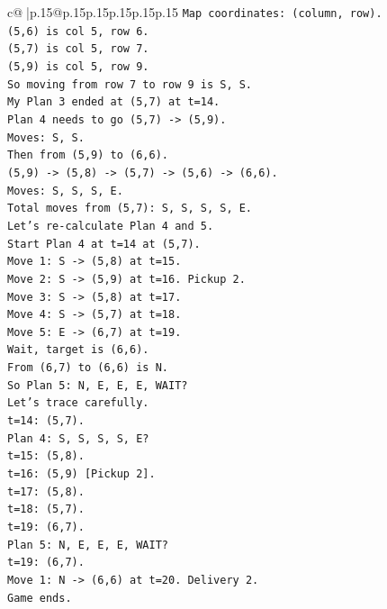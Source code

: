 \documentclass{article}
\begin{document}
{\begin{supertabular}{c@{$\;$}|p{.15\linewidth}@{}p{.15\linewidth}p{.15\linewidth}p{.15\linewidth}p{.15\linewidth}p{.15\linewidth}}
{{{\texttt{Map coordinates: (column, row).} \\
\texttt{(5,6) is col 5, row 6.} \\
\texttt{(5,7) is col 5, row 7.} \\
\texttt{(5,9) is col 5, row 9.} \\
\texttt{So moving from row 7 to row 9 is S, S.} \\
\texttt{My Plan 3 ended at (5,7) at t=14.} \\
\texttt{Plan 4 needs to go (5,7) {-}> (5,9).} \\
\texttt{Moves: S, S.} \\
\texttt{Then from (5,9) to (6,6).} \\
\texttt{(5,9) {-}> (5,8) {-}> (5,7) {-}> (5,6) {-}> (6,6).} \\
\texttt{Moves: S, S, S, E.} \\
\texttt{Total moves from (5,7): S, S, S, S, E.} \\
\texttt{Let's re{-}calculate Plan 4 and 5.} \\
\texttt{Start Plan 4 at t=14 at (5,7).} \\
\texttt{Move 1: S {-}> (5,8) at t=15.} \\
\texttt{Move 2: S {-}> (5,9) at t=16. Pickup 2.} \\
\texttt{Move 3: S {-}> (5,8) at t=17.} \\
\texttt{Move 4: S {-}> (5,7) at t=18.} \\
\texttt{Move 5: E {-}> (6,7) at t=19.} \\
\texttt{Wait, target is (6,6).} \\
\texttt{From (6,7) to (6,6) is N.} \\
\texttt{So Plan 5: N, E, E, E, WAIT?} \\
\texttt{Let's trace carefully.} \\
\texttt{t=14: (5,7).} \\
\texttt{Plan 4: S, S, S, S, E?} \\
\texttt{t=15: (5,8).} \\
\texttt{t=16: (5,9) {[}Pickup 2{]}.} \\
\texttt{t=17: (5,8).} \\
\texttt{t=18: (5,7).} \\
\texttt{t=19: (6,7).} \\
\texttt{Plan 5: N, E, E, E, WAIT?} \\
\texttt{t=19: (6,7).} \\
\texttt{Move 1: N {-}> (6,6) at t=20. Delivery 2.} \\
\texttt{Game ends.} \\
}}}
\end{supertabular}}
\end{document}
